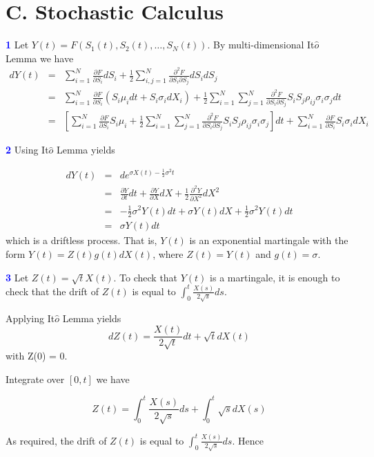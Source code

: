 \documentclass[a4paper,11pt] {article}
\begin{document}
\section*{C. Stochastic Calculus}
\textcolor{blue}{\bf 1 } Let $Y(t) = F(S_1(t), S_2(t),\ldots,S_N(t))$. By multi-dimensional It$\hat{o}$ Lemma we have
\begin{eqnarray*}
dY(t) &=& \sum_{i=1}^N \frac{\partial F}{\partial S_i} dS_i + \frac{1}{2}\sum_{i,j=1}^N \frac{\partial^2 F}{\partial S_i \partial S_j} dS_i dS_j \\
      &=& \sum_{i=1}^N \frac{\partial F}{\partial S_i}\left(S_i\mu_i dt + S_i \sigma_i dX_i\right) + \frac{1}{2}\sum_{i=1}^N\sum_{j=1}^N \frac{\partial^2 F}{\partial S_i \partial S_j} S_i S_j \rho_{ij} \sigma_i \sigma_j dt \\
      &=& \left[\sum_{i=1}^N \frac{\partial F}{\partial S_i}S_i\mu_i + \frac{1}{2}\sum_{i=1}^N\sum_{j=1}^N \frac{\partial^2 F}{\partial S_i \partial S_j} S_i S_j \rho_{ij} \sigma_i \sigma_j\right] dt  + \sum_{i=1}^N \frac{\partial F}{\partial S_i}S_i \sigma_i dX_i
\end{eqnarray*}

\textcolor{blue}{\bf 2} Using It$\hat{o}$ Lemma yields

\begin{eqnarray*}
dY(t) &=& de^{\sigma X(t) - \frac{1}{2}\sigma^2 t} \\
      &=& \frac{\partial Y}{\partial t} dt + \frac{\partial Y}{\partial X} dX + \frac{1}{2} \frac{\partial^2 Y}{\partial X^2} dX^2 \\
      &=& -\frac{1}{2}\sigma^2 Y(t)dt + \sigma Y(t)dX + \frac{1}{2} \sigma^2 Y(t) dt \\
      &=& \sigma Y(t) dt
\end{eqnarray*}
which is a driftless process. That is, $Y(t)$ is an exponential martingale with the form $Y(t)=Z(t)g(t)dX(t)$, where $Z(t) = Y(t)$ and $g(t) = \sigma$.

\textcolor{blue}{\bf 3 } Let $Z(t)=\sqrt{t}X(t)$. To check that $Y(t)$ is a martingale, it is enough to check that the drift of $Z(t)$ is equal to $\int_0^t \frac{X(s)}{2\sqrt{s}}ds$.

Applying It$\hat{o}$ Lemma yields
$$
dZ(t) = \frac{X(t)}{2\sqrt{t}}dt + \sqrt{t}dX(t)
$$
with Z(0) = 0.

Integrate over $[0,t]$ we have

$$
Z(t) = \int_0^t \frac{X(s)}{2\sqrt{s}}ds + \int_0^t \sqrt{s}dX(s)
$$

As required, the drift of $Z(t)$ is equal to $\int_0^t \frac{X(s)}{2\sqrt{s}}ds$. Hence
\end{document}
